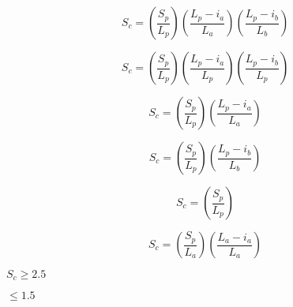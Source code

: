 {\newpage\clearpage
{}%
\begin{displaymath}S_{c} =
\left(
\frac{S_{p}}{L_{p}}
\right)
\left(
\frac{L_{p}-i_{a}}{L_{a}}
\right)
\left(
\frac{L_{p}-i_{b}}{L_{b}}
\right)
\end{displaymath}%
\lthtmldisplayZ
\hfill\lthtmlcheckvsize\clearpage}

{\newpage\clearpage
{}%
\begin{displaymath}S_{c} =
\left(
\frac{S_{p}}{L_{p}}
\right)
\left(
\frac{L_{p}-i_{a}}{L_{p}}
\right)
\left(
\frac{L_{p}-i_{b}}{L_{p}}
\right)
\end{displaymath}%
\lthtmldisplayZ
\hfill\lthtmlcheckvsize\clearpage}

{\newpage\clearpage
{}%
\begin{displaymath}S_{c} =
\left(
\frac{S_{p}}{L_{p}}
\right)
\left(
\frac{L_{p}-i_{a}}{L_{a}}
\right)
\end{displaymath}%
\lthtmldisplayZ
\hfill\lthtmlcheckvsize\clearpage}

{\newpage\clearpage
{}%
\begin{displaymath}S_{c} =
\left(
\frac{S_{p}}{L_{p}}
\right)
\left(
\frac{L_{p}-i_{b}}{L_{b}}
\right)
\end{displaymath}%
\lthtmldisplayZ
\hfill\lthtmlcheckvsize\clearpage}

{\newpage\clearpage
{}%
\begin{displaymath}S_{c} =
\left(
\frac{S_{p}}{L_{p}}
\right)
\end{displaymath}%
\lthtmldisplayZ
\hfill\lthtmlcheckvsize\clearpage}

{\newpage\clearpage
{}%
\begin{displaymath}S_{c} =
\left(
\frac{S_{p}}{L_{a}}
\right)
\left(
\frac{L_{a}-i_{a}}{L_{a}}
\right)
\end{displaymath}%
\lthtmldisplayZ
\hfill\lthtmlcheckvsize\clearpage}

{\newpage\clearpage
{}%
$S_{c} \geq 2.5$%
\lthtmlinlinemathZ
\hfill\lthtmlcheckvsize\clearpage}

{\newpage\clearpage
{}%
$\leq 1.5$%
\lthtmlinlinemathZ
\hfill\lthtmlcheckvsize\clearpage}

